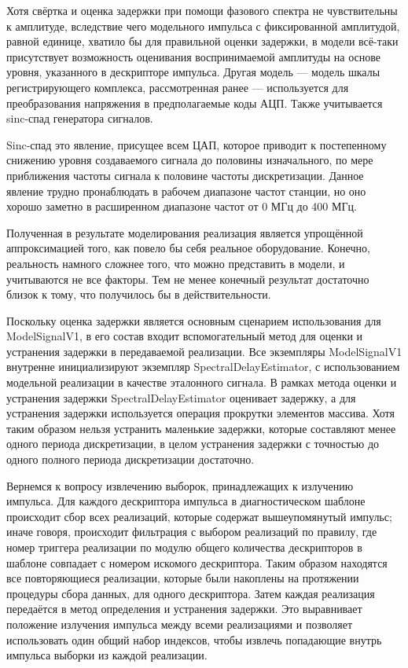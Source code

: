 \documentclass{report}
\begin{document}
Хотя свёртка и оценка задержки при помощи фазового спектра не чувствительны к амплитуде, вследствие чего  модельного импульса с фиксированной амплитудой, равной единице, хватило бы для правильной оценки задержки, в модели всё-таки присутствует возможность оценивания воспринимаемой амплитуды на основе уровня, указанного в дескрипторе импульса. Другая модель --- модель шкалы регистрирующего комплекса, рассмотренная ранее --- используется для преобразования напряжения в предполагаемые коды АЦП. Также учитывается sinc-спад генератора сигналов.

Sinc-спад это явление, присущее всем ЦАП, которое приводит к постепенному снижению уровня создаваемого сигнала до половины изначального, по мере приближения частоты сигнала к половине частоты дискретизации. Данное явление трудно пронаблюдать в рабочем диапазоне частот станции, но оно хорошо заметно в расширенном диапазоне частот от 0 МГц до 400 МГц.

Полученная в результате моделирования реализация является упрощённой аппроксимацией того, как повело бы себя реальное оборудование. Конечно, реальность намного сложнее того, что можно представить в модели, и учитываются не все факторы. Тем не менее конечный результат достаточно близок к тому, что получилось бы в действительности.

Поскольку оценка задержки является основным сценарием использования для ModelSignalV1, в его состав входит вспомогательный метод для оценки и устранения задержки в передаваемой реализации. Все экземпляры ModelSignalV1 внутренне инициализируют экземпляр SpectralDelayEstimator, с использованием модельной реализации в качестве эталонного сигнала. В рамках метода оценки и устранения задержки SpectralDelayEstimator оценивает задержку, а для устранения задержки используется операция прокрутки элементов массива. Хотя таким образом нельзя устранить маленькие задержки, которые составляют менее одного периода дискретизации, в целом устранения задержки с точностью до одного полного периода дискретизации достаточно.

Вернемся к вопросу извлечению выборок, принадлежащих к излучению импульса. Для каждого дескриптора импульса в диагностическом шаблоне происходит сбор всех реализаций, которые содержат вышеупомянутый импульс; иначе говоря, происходит фильтрация с выбором реализаций по правилу, где номер триггера реализации по модулю общего количества дескрипторов в шаблоне совпадает с номером искомого дескриптора. Таким образом находятся все повторяющиеся реализации, которые были накоплены на протяжении процедуры сбора данных, для одного дескриптора. Затем каждая реализация передаётся в метод определения и устранения задержки. Это выравнивает положение излучения импульса между всеми реализациями и позволяет использовать один общий набор индексов, чтобы извлечь попадающие внутрь импульса выборки из каждой реализации.
\end{document}
